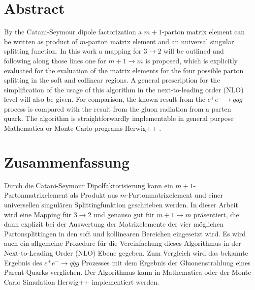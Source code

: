 \thispagestyle{empty}
\section*{\Large \bfseries \centering Abstract}
\vspace{1cm}

By the Catani-Seymour dipole factorization a $m+1$-parton matrix element can be written as product of $m$-parton matrix element and an universal singular splitting function.  
In this work a mapping for $ 3\rightarrow 2 $ will be outlined and following along those lines one for $ m+1\rightarrow m $ is proposed, which is explicitly evaluated for the evaluation of the matrix elements for the four possible parton splitting in the soft and collinear regions. A general prescription for the simplification of the usage of this algorithm in the next-to-leading order (NLO) level will also be given.  For comparison, the known result from the $ e^{+}e^{-} \rightarrow q \bar{q} g $ process is compared with the result from the gluon radiation from a parten quark. 
The algorithm is straightforwardly implementable in general purpose \textup{Mathematica} or Monte Carlo programs \textup{Herwig++} \cite{Bahr:2008pv}.

\vspace{3cm}
\section*{\Large \bfseries \centering Zusammenfassung}
\vspace{1cm}

Durch die Catani-Seymour Dipolfaktorisierung kann ein $m+1$-Partonmatrixelement als Produkt aus $m$-Partonmatrixelement und einer universellen singul\"aren Splittingfunktion geschrieben werden.  
In dieser Arbeit wird eine Mapping für $ 3\rightarrow 2 $ und genauso gut f\"ur $ m+1\rightarrow m $ pr\"asentiert, die dann explizit bei der Auswertung der Matrixelemente der vier möglichen Partonsplittingen in den soft und kollinearen Bereichen eingesetzt wird. Es wird auch ein allgemeine Prozedure für die Vereinfachung dieses Algorithmus in der Next-to-Leading Order (NLO) Ebene gegeben.  Zum Vergleich wird das bekannte Ergebnis des $ e^{+}e^{-} \rightarrow q \bar{q} g $ Prozesses mit dem Ergebnis der Gluonenstrahlung eines Parent-Quarks verglichen. 
Der Algorithmus kann in \textup{Mathematica} oder der Monte Carlo Simulation \textup{Herwig++} \cite{Bahr:2008pv} implementiert werden.